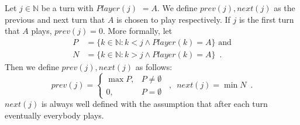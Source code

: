 \begin{definition}
  Let $j \in \mathbb{N}$ be a turn with $Player\left(j\right)$ $= A$. We define $prev\left(j\right), next\left(j\right)$
  as the previous and next turn that $A$ is chosen to play respectively. If $j$ is the first turn that $A$ plays,
  $prev\left(j\right) = 0$. More formally, let
  \begin{align*}
    P &= \{k \in \mathbb{N} : k < j \wedge Player\left(k\right) = A\} \mbox{ and} \\
    N &= \{k \in \mathbb{N} : k > j \wedge Player\left(k\right) = A\} \enspace.
  \end{align*}
  Then we define $prev\left(j\right), next\left(j\right)$ as follows:
  \begin{equation*}
    prev\left(j\right) = \begin{cases}
      \max{P}, & P \neq \emptyset \\
      0, & P = \emptyset
    \end{cases} \enspace, \enspace
    next\left(j\right) = \min{N} \enspace.
  \end{equation*}
  $next\left(j\right)$ is always well defined with the assumption that after each turn eventually everybody plays.
\end{definition}
